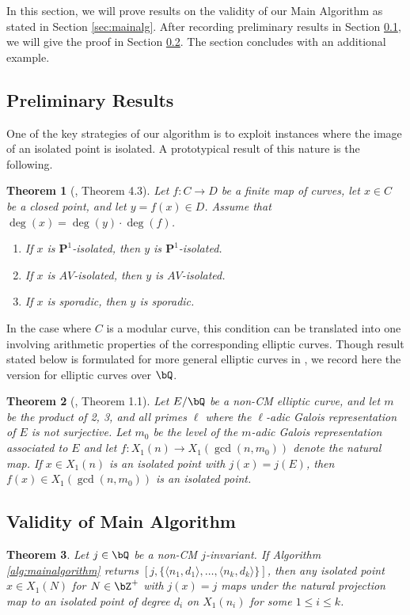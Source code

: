 \documentclass[11pt,reqno]{amsart}
\theoremstyle{plain}
\newtheorem{theorem}{Theorem}%
\theoremstyle{definition}
\newcommand{\Q}{\bQ}
\newcommand{\Z}{\bZ}
\newcommand{\PP}{\mathbf P}
\begin{document}
In this section, we will prove results on the validity of our Main Algorithm as stated in Section \ref{sec:mainalg}. After recording preliminary results in Section \ref{sec:prelimresult}, we will give the proof in Section \ref{sec:proofvalidity}. The section concludes with an additional example.

\subsection{Preliminary Results}
\label{sec:prelimresult}
One of the key strategies of our algorithm is to exploit instances where the image of an isolated point is isolated. A prototypical result of this nature is the following.
\begin{theorem}[\cite{BELOV}, Theorem 4.3]
\label{thm:PushingForwardSporadicIsolated}
    Let $f\colon C \to D$ be a finite map of curves, let $x\in C$ be a closed point, and let $y = f(x) \in D$.  Assume that $\deg(x) = \deg(y)\cdot\deg(f)$.
    \begin{enumerate}
        \item If $x$ is $\PP^1$-isolated, then $y$ is $\PP^1$-isolated.
                \item If $x$ is $AV$-isolated, then $y$ is $AV$-isolated.
        \item If $x$ is sporadic, then $y$ is sporadic.
    \end{enumerate}
\end{theorem}

In the case where $C$ is a modular curve, this condition can be translated into one involving arithmetic properties of the corresponding elliptic curves. Though result stated below is formulated for more general elliptic curves in \cite{BELOV}, we record here the version for elliptic curves over $\Q$.

\begin{theorem}[\cite{BELOV}, Theorem 1.1]\label{BELOVthm}
Let $E/\Q$ be a non-CM elliptic curve, and let $m$ be the product of 2, 3, and all primes $\ell$ where the $\ell$-adic Galois representation of $E$ is not surjective. Let $m_0$ be the level of the $m$-adic Galois representation associated to $E$ and let $f\colon X_1(n) \rightarrow X_1(\gcd(n,m_0))$ denote the natural map. If $x\in X_1(n)$ is an isolated point with $j(x)=j(E)$, then $f(x)\in X_1(\gcd(n,m_0))$ is an isolated point.
\end{theorem}

\subsection{Validity of Main Algorithm}
\label{sec:proofvalidity}
\begin{theorem}\label{thm:validity_main_algorithm}
Let $j\in\Q$ be a non-CM $j$-invariant. If Algorithm \ref{alg:mainalgorithm} returns $[j,\{\langle n_1,d_1\rangle, \dots, \langle n_k,d_k\rangle \}]$, then any isolated point $x\in X_1(N)$ for $N \in \Z^+$ with $j(x)=j$ maps under the natural projection map to an isolated point of degree $d_i$ on $X_1(n_i)$ for some  $1 \leq i \leq k$.
\end{theorem}
\end{document}
